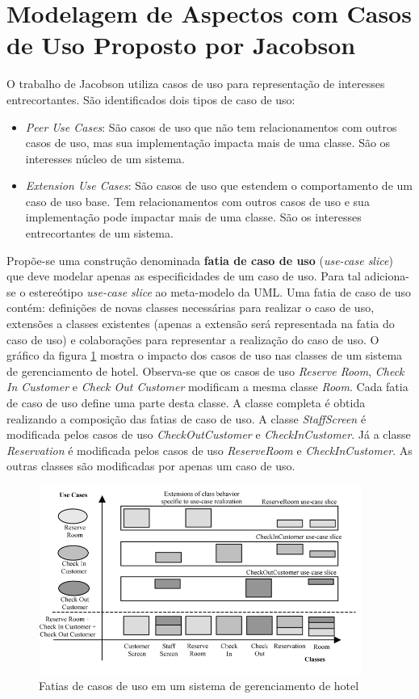 \section{Modelagem de Aspectos com Casos de Uso Proposto por Jacobson}

O trabalho de Jacobson \cite{Jacobson:2004:ASD:1062430} utiliza casos de uso para representação de interesses entrecortantes. São identificados dois
tipos de caso de uso:

\begin{itemize}
  \item \textit{Peer Use Cases}: São casos de uso que não tem relacionamentos com outros casos de uso, mas sua implementação impacta mais de uma
  classe. São os interesses núcleo de um sistema.
  \item \textit{Extension Use Cases}: São casos de uso que estendem o comportamento de um caso de uso base. Tem relacionamentos com outros casos de
  uso e sua implementação pode impactar mais de uma classe. São os interesses entrecortantes de um sistema.
\end{itemize}

Propõe-se uma construção denominada \textbf{fatia de caso de uso} (\textit{use-case slice}) que deve modelar apenas as especificidades de um 
caso de uso. Para tal adiciona-se o estereótipo \textit{use-case slice} ao meta-modelo da UML. Uma fatia de caso de uso contém: definições de novas
classes necessárias para realizar o caso de uso, extensões a classes existentes (apenas a extensão será representada na fatia do caso de uso) e
colaborações para representar a realização do caso de uso. O gráfico da figura \ref{fig:jacobson_slices} mostra o impacto dos casos de uso nas classes
de um sistema de gerenciamento de hotel. Observa-se que os casos de uso \textit{Reserve Room}, \textit{Check In Customer} e \textit{Check Out
Customer} modificam a mesma classe \textit{Room}. Cada fatia de caso de uso define uma parte desta classe. A classe completa é obtida realizando a
composição das fatias de caso de uso. A classe \textit{StaffScreen} é modificada pelos casos de uso \textit{CheckOutCustomer} e
\textit{CheckInCustomer}. Já a classe \textit{Reservation} é modificada pelos casos de uso \textit{ReserveRoom} e \textit{CheckInCustomer}. As outras
classes são modificadas por apenas um caso de uso.

\begin{figure}
	\centering
	\includegraphics[width=400px]{img/jacobson_slices.png}
	\caption{Fatias de casos de uso em um sistema de
	gerenciamento de hotel}\label{fig:jacobson_slices}
\end{figure}

